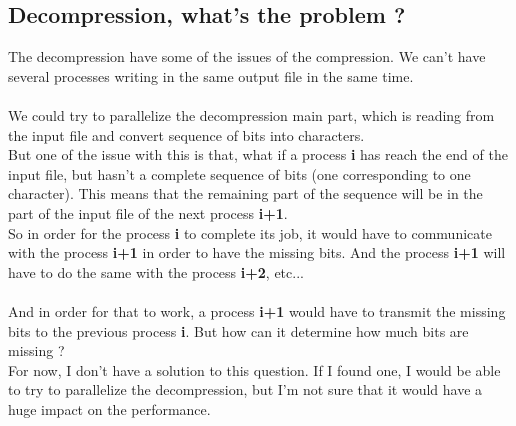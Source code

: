 \subsection{Decompression, what's the problem ?}
The decompression have some of the issues of the compression. We can't have several processes writing in the same output file in the same time.\\
\\
We could try to parallelize the decompression main part, which is reading from the input file and convert sequence of bits into characters.\\
But one of the issue with this is that, what if a process \textbf{i} has reach the end of the input file, but hasn't a complete sequence of bits (one corresponding to one character). This means that the remaining part of the sequence will be in the part of the input file of the next process \textbf{i+1}.\\
So in order for the process \textbf{i} to complete its job, it would have to communicate with the process \textbf{i+1} in order to have the missing bits. And the process \textbf{i+1} will have to do the same with the process \textbf{i+2}, etc...\\
\\
And in order for that to work, a process \textbf{i+1} would have to transmit the missing bits to the previous process \textbf{i}. But how can it determine how much bits are missing ?\\
For now, I don't have a solution to this question. If I found one, I would be able to try to parallelize the decompression, but I'm not sure that it would have a huge impact on the performance.